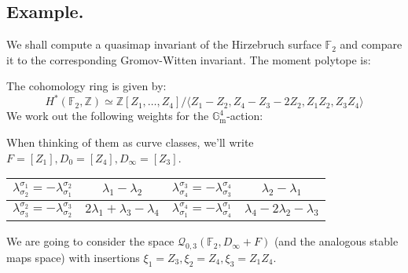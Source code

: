 \documentclass[11pt]{amsart}
\newcommand{\Q}[4]{\mathcal{Q}_{#1,#2}(#3,#4)}
\newcommand{\Gm}{\mathbb{G}_{\text{m}}}
\newcommand{\ZZ}{\mathbb{Z}}
\theoremstyle{definition}
\theoremstyle{definition}
\begin{document}
\subsection{Example.} We shall compute a quasimap invariant of the Hirzebruch surface $\mathbb F_2$ and compare it to the corresponding Gromov-Witten invariant. The moment polytope is:
\begin{center}
\end{center}
The cohomology ring is given by:
\[
 H^*(\mathbb F_2,\ZZ)\simeq\ZZ[Z_1,\ldots,Z_4]/\langle Z_1-Z_2,Z_4-Z_3-2Z_2, Z_1Z_2,Z_3Z_4\rangle
\]
We work out the following weights for the $\Gm^4$-action:

When thinking of them as curve classes, we'll write $F=[Z_1], D_0=[Z_4], D_\infty=[Z_3]$.

\begin{center}
 \begin{tabular}{||c|c||c|c||}
  \hline\hline
  $\lambda^{\sigma_1}_{\sigma_2}=-\lambda^{\sigma_2}_{\sigma_1}$ & $\lambda_1-\lambda_2$ & $\lambda^{\sigma_3}_{\sigma_4}=-\lambda^{\sigma_4}_{\sigma_3}$ & $\lambda_2-\lambda_1$ \\
  \hline
  $\lambda^{\sigma_2}_{\sigma_3}=-\lambda^{\sigma_3}_{\sigma_2}$ & $2\lambda_1+\lambda_3-\lambda_4$ & $\lambda^{\sigma_4}_{\sigma_1}=-\lambda^{\sigma_1}_{\sigma_4}$ & $\lambda_4-2\lambda_2-\lambda_3$ \\
  \hline\hline
 \end{tabular}
\end{center}

We are going to consider the space $\Q{0}{3}{\mathbb F_2}{D_\infty+F}$ (and the analogous stable maps space) with insertions $\xi_1=Z_3,\xi_2=Z_4,\xi_3=Z_1Z_4$.
\end{document}
